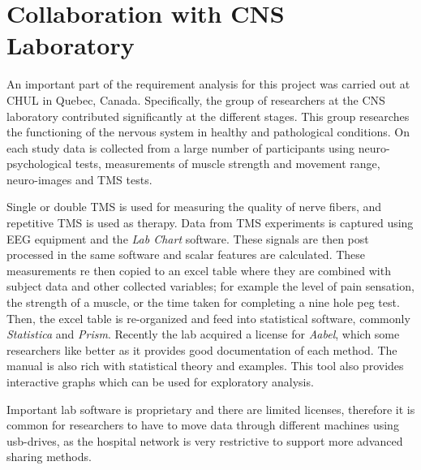 
\section{Collaboration with CNS Laboratory}

An important part of the requirement analysis for this project was carried out at CHUL in Quebec, Canada. Specifically, the group of researchers at the CNS laboratory contributed significantly at the different stages. This group researches the functioning of the nervous system in healthy and pathological conditions. On each study data is collected from a large number of participants using neuro-psychological tests, measurements of muscle strength and movement range, neuro-images and TMS tests. 

Single or double TMS is used for measuring the quality of nerve fibers, and repetitive TMS is used as therapy. Data from TMS experiments is captured using EEG equipment and the \emph{Lab Chart} software. These signals are then post processed in the same software and scalar features are calculated. These measurements re then copied to an excel table where they are combined with subject data and other collected variables; for example the level of pain sensation, the strength of a muscle, or the time taken for completing a nine hole peg test. Then, the excel table is re-organized and feed into statistical software, commonly \emph{Statistica} and \emph{Prism}. Recently the lab acquired a license for \emph{Aabel}, which some researchers like better as it provides good documentation of each method. The manual is also rich with statistical theory and examples. This tool also provides interactive graphs which can be used for exploratory analysis. 

Important lab software is proprietary and there are limited licenses, therefore it is common for researchers to have to move data through different machines using usb-drives, as the hospital network is very restrictive to support more advanced sharing methods.



 

